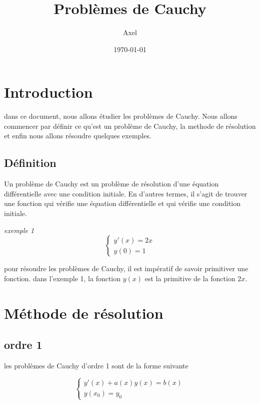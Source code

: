 \documentclass{article}
\title{Problèmes de Cauchy}
\author{Axel}
\date{\today}
\begin{document}
\maketitle

\section{Introduction}
dans ce document, nous allons étudier les problèmes de Cauchy.
Nous allons commencer par définir ce qu'est un problème de Cauchy,
la methode de résolution et enfin nous allons résoudre quelques exemples.

\subsection{Définition}
Un problème de Cauchy est un problème de résolution d'une équation différentielle
avec une condition initiale. En d'autres termes, il s'agit de trouver une fonction
qui vérifie une équation différentielle et qui vérifie une condition initiale.

\textit{exemple 1}
\begin{equation}
    \begin{cases}
        y'(x) = 2x \\
        y(0) = 1
    \end{cases}
\end{equation}

pour résoudre les problèmes de Cauchy, il est impératif de savoir primitiver une fonction.
dans l'exemple 1, la fonction $y(x)$ est la primitive de la fonction $2x$.

\section{Méthode de résolution}

\subsection{ordre 1}

les problèmes de Cauchy d'ordre 1 sont de la forme suivante

\begin{equation}\tag{E}\label{E}
    \begin{cases}
        y'(x) + a(x)y(x) = b(x) \\
        y(x_0) = y_0
    \end{cases}
\end{equation}
\end{document}
